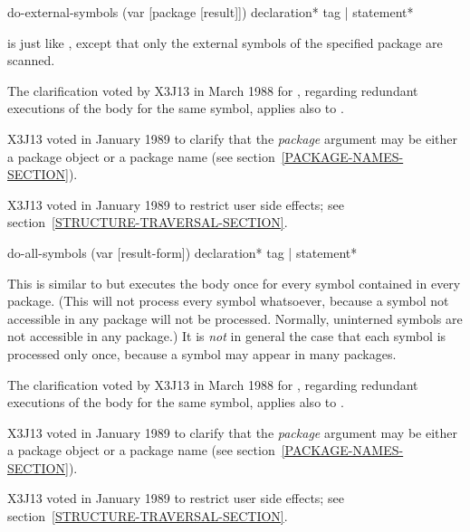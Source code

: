 \begin{defmac}
do-external-symbols (var [package [result]])
                    {declaration}* {tag | statement}*

 is just like , except that only
the external symbols of the specified package are scanned.
\begin{new}
The clarification voted by X3J13
in March 1988 for 
,
regarding redundant executions of the body for the same symbol,
applies also to .
\end{new}

\begin{new}
X3J13 voted in January 1989
to clarify that the {\it package} argument may be either a package object
or a package name (see section~\ref{PACKAGE-NAMES-SECTION}).
\end{new}

\begin{new}
X3J13 voted in January 1989
to restrict user side effects; see section~\ref{STRUCTURE-TRAVERSAL-SECTION}.
\end{new}
\end{defmac}

\begin{defmac}
do-all-symbols (var [result-form])
               {declaration}* {tag | statement}*

This is similar to  but executes the body once for every
symbol contained in every package.  (This will not process every symbol
whatsoever, because a symbol not accessible in any package will not
be processed.  Normally, uninterned symbols are not accessible in any package.)
It is {\it not} in general
the case that each symbol is processed only once, because a symbol may
appear in many packages.

\begin{new}
The clarification voted by X3J13
in March 1988 for 
,
regarding redundant executions of the body for the same symbol,
applies also to .
\end{new}

\begin{new}
X3J13 voted in January 1989
to clarify that the {\it package} argument may be either a package object
or a package name (see section~\ref{PACKAGE-NAMES-SECTION}).
\end{new}

\begin{new}
X3J13 voted in January 1989
to restrict user side effects; see section~\ref{STRUCTURE-TRAVERSAL-SECTION}.
\end{new}
\end{defmac}

